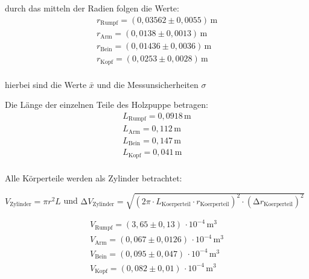 \begin{center}
    durch das mitteln der Radien folgen die Werte: \\
    \begin{align*}
        r_{\text{Rumpf}} = (0,03562\pm 0,0055)\, \unit{\meter} \\
        r_{\text{Arm}} = (0,0138 \pm 0,0013)\, \unit{\meter}  \\
        r_{\text{Bein}} = (0,01436 \pm 0,0036)\, \unit{\meter}  \\
        r_{\text{Kopf}} = (0,0253 \pm 0,0028)\, \unit{\meter}  \\
    \end{align*}

    hierbei sind die Werte  $\bar{x} $ und die Messunsicherheiten $\sigma$ 

    \vspace{0.3cm}

    Die Länge der einzelnen Teile des Holzpuppe betragen:\\
    
    \begin{align*}
    L_{\text{Rumpf}} = 0,0918\, \unit{\meter} \\
    L_{\text{Arm}} = 0,112\, \unit{\meter} \\
    L_{\text{Bein}} = 0,147\, \unit{\meter} \\
    L_{\text{Kopf}} = 0,041\,\unit{\meter} \\
    \end{align*}
\end{center}

\begin{center}
    Alle Körperteile werden als Zylinder betrachtet: \\

    \vspace{0.3cm}

    $V_{\text{Zylinder}} = \pi r^2 L $   und $ \increment V_{\text{Zylinder}} =\sqrt{\left( 2 \pi \cdot L_{\text{Koerperteil}} \cdot r_{\text{Koerperteil}}\right)^2 \cdot \left(\increment r_{\text{Koerperteil}}\right)^2} $

    \begin{align*}
     V_{\text{Rumpf}} = (3,65 \pm 0,13)\, \cdot 10^{-4}\,\unit{\meter^3}  \\
     V_{\text{Arm}} = (0,067 \pm 0,0126)\, \cdot 10^{-4}\,\unit{\meter^3}  \\
     V_{\text{Bein}} = (0,095 \pm 0,047)\, \cdot 10^{-4}\,\unit{\meter^3}  \\
     V_{\text{Kopf}} = (0,082 \pm 0,01)\,  \cdot 10^{-4}\,\unit{\meter^3}  \\
    \end{align*}
\end{center}

